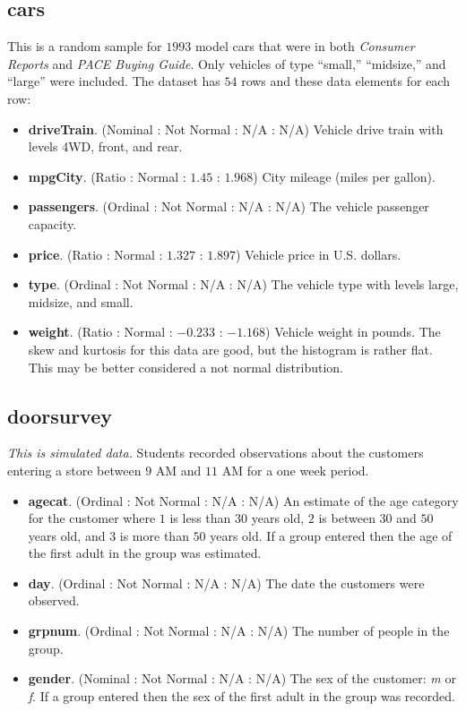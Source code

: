 \subsection{cars}

This is a random sample for $ 1993 $ model cars that were in both \textit{Consumer Reports} and \textit{PACE Buying Guide}. Only vehicles of type ``small,'' ``midsize,'' and ``large'' were included. The dataset has $ 54 $ rows and these data elements for each row:

\begin{itemize}
  \item \textbf{driveTrain}. (Nominal : Not Normal : N/A : N/A) Vehicle drive train with levels 4WD, front, and rear.
  \item \textbf{mpgCity}. (Ratio : Normal : $ 1.45 $ : $ 1.968 $) City mileage (miles per gallon).
  \item \textbf{passengers}. (Ordinal : Not Normal : N/A : N/A) The vehicle passenger capacity. 
  \item \textbf{price}. (Ratio : Normal : $ 1.327 $ : $ 1.897 $) Vehicle price in U.S. dollars.
  \item \textbf{type}. (Ordinal : Not Normal : N/A : N/A) The vehicle type with levels large, midsize, and small.
  \item \textbf{weight}. (Ratio : Normal : $ -0.233 $ : $ -1.168 $) Vehicle weight in pounds. The skew and kurtosis for this data are good, but the histogram is rather flat. This may be better considered a not normal distribution.
\end{itemize}

\subsection{doorsurvey}

\textit{This is simulated data.} Students recorded observations about the customers entering a store between $ 9 $ AM and $ 11 $ AM for a one week period.

\begin{itemize}
  \item \textbf{agecat}. (Ordinal : Not Normal : N/A : N/A) An estimate of the age category for the customer where $ 1 $ is less than $ 30 $ years old, $ 2 $ is between $ 30 $ and $ 50 $ years old, and $ 3 $ is more than $ 50 $ years old. If a group entered then the age of the first adult in the group was estimated.
  \item \textbf{day}. (Ordinal : Not Normal : N/A : N/A) The date the customers were observed.
  \item \textbf{grpnum}. (Ordinal : Not Normal : N/A : N/A) The number of people in the group.
  \item \textbf{gender}. (Nominal : Not Normal : N/A : N/A) The sex of the customer: \textit{m} or \textit{f}. If a group entered then the sex of the first adult in the group was recorded.
\end{itemize}

